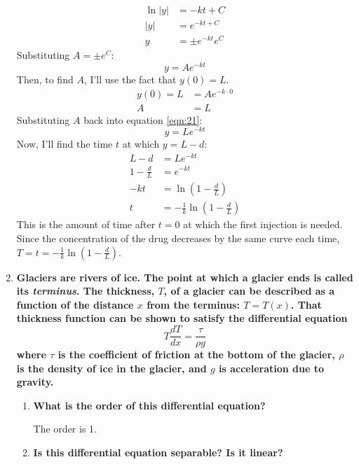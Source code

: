 \documentclass[11pt]{article}
\begin{document}
\begin{enumerate}[label={\textbf{\arabic*.}}]
{\begin{align*}
                \ln|y|&=-kt+C \\
                |y|&=e^{-kt+C} \\
                y&=\pm e^{-kt}e^C
            \end{align*}
            Substituting $A=\pm e^C$:
            \begin{equation}
                y=Ae^{-kt} \label{eqn:21}
            \end{equation}
            Then, to find $A$, I'll use the fact that $y(0)=L$.
            \begin{align*}
                y(0)=L&=Ae^{-k\cdot0} \\
                A&=L
            \end{align*}
            Substituting $A$ back into equation \ref{eqn:21}:
            $$y=Le^{-kt}$$
            Now, I'll find the time $t$ at which $y=L-d$:
            \begin{align*}
                L-d&=Le^{-kt} \\
                1-\frac{d}{L}&=e^{-kt} \\
                -kt&=\ln\left(1-\frac{d}{L}\right) \\
                t&=-\frac{1}{k}\ln\left(1-\frac{d}{L}\right)
            \end{align*}
            This is the amount of time after $t=0$ at which the first injection is needed. Since the concentration of the drug decreases by the same curve each time, $T=t=-\frac{1}{k}\ln\left(1-\frac{d}{L}\right)$.
        }
        \item{
            \textbf{\boldmath Glaciers are rivers of ice. The point at which a glacier ends is called its \textit{terminus}. The thickness, $T$, of a glacier can be described as a function of the distance $x$ from the terminus: $T=T(x)$. That thickness function can be shown to satisfy the differential equation $$T\frac{dT}{dx}=\frac{\tau}{\rho g}$$ where $\tau$ is the coefficient of friction at the bottom of the glacier, $\rho$ is the density of ice in the glacier, and $g$ is acceleration due to gravity.}
            \begin{enumerate}[label={\textbf{(\alph*)}}]
                \item{
                    \textbf{What is the order of this differential equation?}
                    \par
                    The order is 1.
                }
                \item{
                    \textbf{Is this differential equation separable? Is it linear?}
}
\end{enumerate}}
\end{enumerate}
\end{document}
